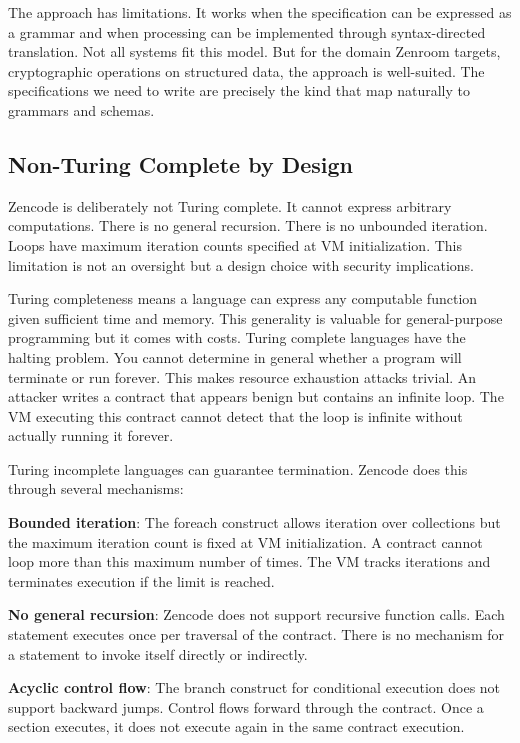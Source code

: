 The approach has limitations. It works when the specification can be
expressed as a grammar and when processing can be implemented through
syntax-directed translation. Not all systems fit this model. But for
the domain Zenroom targets, cryptographic operations on structured
data, the approach is well-suited. The specifications we need to write
are precisely the kind that map naturally to grammars and schemas.

\subsection{Non-Turing Complete by Design}

Zencode is deliberately not Turing complete. It cannot express
arbitrary computations. There is no general recursion. There is no
unbounded iteration. Loops have maximum iteration counts specified at
VM initialization. This limitation is not an oversight but a design
choice with security implications.

Turing completeness means a language can express any computable
function given sufficient time and memory. This generality is valuable
for general-purpose programming but it comes with costs. Turing
complete languages have the halting problem. You cannot determine in
general whether a program will terminate or run forever. This makes
resource exhaustion attacks trivial. An attacker writes a contract
that appears benign but contains an infinite loop. The VM executing
this contract cannot detect that the loop is infinite without actually
running it forever.

Turing incomplete languages can guarantee termination. Zencode does
this through several mechanisms:

\textbf{Bounded iteration}: The foreach construct allows iteration
over collections but the maximum iteration count is fixed at VM
initialization. A contract cannot loop more than this maximum number
of times. The VM tracks iterations and terminates execution if the
limit is reached.

\textbf{No general recursion}: Zencode does not support recursive
function calls. Each statement executes once per traversal of the
contract. There is no mechanism for a statement to invoke itself
directly or indirectly.

\textbf{Acyclic control flow}: The branch construct for conditional
execution does not support backward jumps. Control flows forward
through the contract. Once a section executes, it does not execute
again in the same contract execution.

